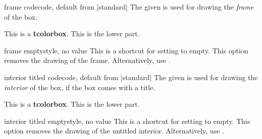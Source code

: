 \begin{docTcbKey}{frame code}{}{code, default from |standard|}
  The given  is used for drawing the \emph{frame} of the box.
\begin{dispExample}

\begin{tcolorbox}[enhanced,frame code={
  \foreach \n in {north east,north west,south east,south west}
  {\path [fill=red!75!black] (interior.\n) circle (3mm); }; }]
This is a \textbf{tcolorbox}.
\tcblower
This is the lower part.
\end{tcolorbox}
\end{dispExample}
\end{docTcbKey}


\begin{docTcbKey}{frame empty}{}{style, no value}
  This is a shortcut for setting   to empty.
  This option removes the drawing of the frame.
  Alternatively, use .
\end{docTcbKey}


\begin{docTcbKey}{interior titled code}{}{code, default from |standard|}
  The given  is used
  for drawing the \emph{interior} of the box, if the box comes with a title.
\begin{dispExample}

\begin{tcolorbox}[enhanced,title=My title,interior titled code={
  \path[draw=red!5!white,line width=5mm,line cap=round]
    ([xshift=3mm,yshift=-3mm]interior.north west)
    --([xshift=-3mm,yshift=3mm]interior.south east)
    ([xshift=3mm,yshift=3mm]interior.south west)
    --([xshift=-3mm,yshift=-3mm]interior.north east);}]
This is a \textbf{tcolorbox}.
\tcblower
This is the lower part.
\end{tcolorbox}
\end{dispExample}
\end{docTcbKey}


\begin{docTcbKey}{interior titled empty}{}{style, no value}
  This is a shortcut for setting   to empty.
  This option removes the drawing of the untitled interior.
  Alternatively, use .
\end{docTcbKey}



